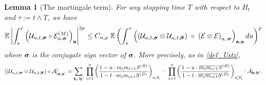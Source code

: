 \documentclass[10pt,reqno]{article}
\theoremstyle{plain} %
\newtheorem{lemma}[theorem]{Lemma}
\theoremstyle{remark}
\numberwithin{equation}{section}
\begin{document}
\begin{lemma}[The martingale term]\label{lem:DIfREP}
For any stopping time $T$ with respect to  $H_t$ and  $\tau:= t\wedge T$, we have  
 \begin{equation}\label{alu9_STime}
   \mathbb{E} \left| \int_{s}^\tau\left(\mathcal{U}_{u, t, \boldsymbol{\sigma}} \circ \mathcal{E}^{(M)}_{u, \boldsymbol{\sigma}}\right)_{\textbf{a}} \right|^{2p} 
   \le C_{n,p} \; 
   \mathbb{E} \left(\int_{s}^\tau 
   \left(\left(
   \mathcal{U}_{u, t,  \boldsymbol{\sigma}}
   \otimes 
   \mathcal{U}_{u, t,  \overline{\boldsymbol{\sigma}}}
   \right) \;\circ  \;
   \left( \mathcal{E} \otimes  \mathcal{E} \right)
   _{u, \,\boldsymbol{\sigma}  }
   \right)_{{\textbf a}, {\textbf a}}du 
   \right)^{p}
  \end{equation} 
  where  $\overline{\boldsymbol{\sigma}}$ is the conjugate sign vector of ${\boldsymbol{\sigma}}$. More precisely, as in \eqref{def_Ustz}, 
  $$
  \left[\left(
   \mathcal{U}_{u, t,  \boldsymbol{\sigma}}
   \otimes 
   \mathcal{U}_{u, t,  \overline{\boldsymbol{\sigma}}}
   \right)\circ \cal A\right]_{\textbf{a},\textbf{a}'}=
   \sum_{\textbf{b},\;\textbf{b}'} \; \prod_{i=1}^n \left(\frac{1 - u \cdot m_i m_{i+1} S^{(B)}}{1 - t \cdot m_i m_{i+1} S^{(B)}}\right)_{a_i b_i}
   \;\cdot \;\prod_{i=1}^n \left(\frac{1 - u \cdot \overline{m_i m_{i+1}} S^{(B)}}{1 - t \cdot \overline{m_i m_{i+1}} S^{(B)}}\right)_{a'_i b'_i} \cdot \mathcal{A}_{\textbf{b},\textbf{b}'}.
  $$
\end{lemma}
\end{document}
